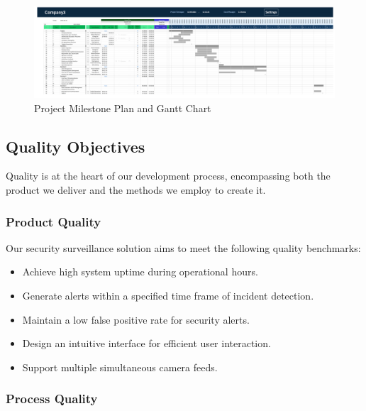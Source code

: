 \begin{figure}[h]
    \centering
    \includegraphics[width=\textwidth]{Milestone Plan-1.png}
    \caption{Project Milestone Plan and Gantt Chart}
    \label{fig:milestone-plan}
\end{figure}

\subsection{Quality Objectives}

Quality is at the heart of our development process, encompassing both the product we deliver and the methods we employ to create it.

\subsubsection{Product Quality}

Our security surveillance solution aims to meet the following quality benchmarks:

\begin{itemize}
    \item Achieve high system uptime during operational hours.
    \item Generate alerts within a specified time frame of incident detection.
    \item Maintain a low false positive rate for security alerts.
    \item Design an intuitive interface for efficient user interaction.
    \item Support multiple simultaneous camera feeds.
\end{itemize}


\subsubsection{Process Quality}

